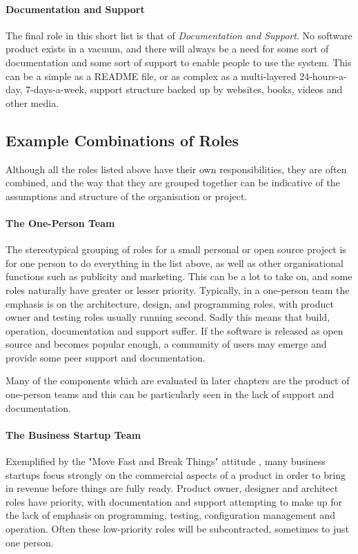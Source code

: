 \paragraph{Documentation and Support}
The final role in this short list is that of \emph{Documentation and Support}. No software product exists in a vacuum, and there will always be a need for some sort of documentation and some sort of support to enable people to use the system. This can be a simple as a README file, or as complex as a multi-layered 24-hours-a-day, 7-days-a-week, support structure backed up by websites, books, videos and other media.

\subsection{Example Combinations of Roles}

Although all the roles listed above have their own responsibilities, they are often combined, and the way that they are grouped together can be indicative of the assumptions and structure of the organisation or project.

\paragraph{The One-Person Team}
The stereotypical grouping of roles for a small personal or open source project is for one person to do everything in the list above, as well as other organisational functions such as publicity and marketing. This can be a lot to take on, and some roles naturally have greater or lesser priority. Typically, in a one-person team the emphasis is on the architecture, design, and programming roles, with product owner and testing roles usually running second. Sadly this means that build, operation, documentation and support suffer. If the software is released as open source and becomes popular enough, a community of users may emerge and provide some peer support and documentation.

Many of the components which are evaluated in later chapters  are the product of one-person teams and this can be particularly seen in the lack of support and documentation.

\paragraph{The Business Startup Team}
Exemplified by the "Move Fast and Break Things" attitude \citep{Taplin2018}, many business startups focus strongly on the commercial aspects of a product in order to bring in revenue before things are fully ready. Product owner, designer and architect roles have priority, with documentation and support attempting to make up for the lack of emphasis on programming, testing, configuration management and operation. Often these low-priority roles will be subcontracted, sometimes to just one person.

